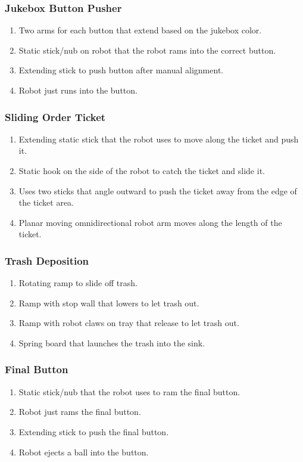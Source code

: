 \documentclass[12pt]{extarticle}
\begin{document}
\subsubsection*{Jukebox Button Pusher}
\begin{enumerate}
    \item Two arms for each button that extend based on the jukebox color.
    \item Static stick/nub on robot that the robot rams into the correct button.
    \item Extending stick to push button after manual alignment.
    \item Robot just runs into the button.
\end{enumerate}

\subsubsection*{Sliding Order Ticket}
\begin{enumerate}
    \item Extending static stick that the robot uses to move along the ticket and push it.
    \item Static hook on the side of the robot to catch the ticket and slide it.
    \item Uses two sticks that angle outward to push the ticket away from the edge of the ticket area.
    \item Planar moving omnidirectional robot arm moves along the length of the ticket.
\end{enumerate}

\subsubsection*{Trash Deposition}
\begin{enumerate}
    \item Rotating ramp to slide off trash.
    \item Ramp with stop wall that lowers to let trash out.
    \item Ramp with robot claws on tray that release to let trash out.
    \item Spring board that launches the trash into the sink.
\end{enumerate}

\subsubsection*{Final Button}
\begin{enumerate}
    \item Static stick/nub that the robot uses to ram the final button.
    \item Robot just rams the final button.
    \item Extending stick to push the final button.
    \item Robot ejects a ball into the button.
\end{enumerate}
\end{document}
